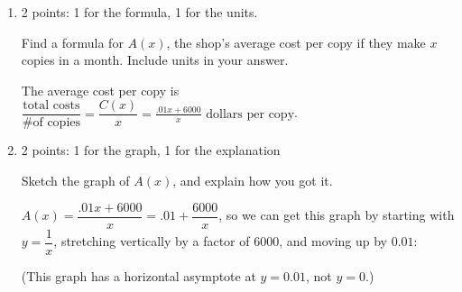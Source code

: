 \documentclass{article}
\begin{document}
\begin{enumerate}
\begin{enumerate}
  \item

    \begin{grading}
      2 points: 1 for the formula, 1 for the units.
    \end{grading}

    \begin{problem}[\stretch{0.35}]
      Find a formula for $A(x)$, the shop's average cost per copy if
      they make $x$ copies in a month. Include units in your answer. 
    \end{problem}

    \begin{solution} 
      The average cost per copy is
      $\dfrac{\text{total costs}}{\text{\# of copies}} = \dfrac{C(x)
      }{x} = \boxed{\frac{.01x +6000}{x} \text{ dollars per copy}}$.
    \end{solution}

  \item

    \begin{grading}
      2 points: 1 for the graph, 1 for the explanation
    \end{grading}

    \begin{problem}[\vfill\newpage]
      Sketch the graph of $A(x)$, and explain how you got it. 
    \end{problem}

    \begin{solution}
      $A(x) = \dfrac{.01x +6000}{x} = .01 + \dfrac{6000}{x}$, so we
      can get this graph by starting with $y = \dfrac{1}{x}$, 
      stretching vertically by a factor of 6000, and moving up by
      $0.01$:
      \begin{center}
      \end{center}
      (This graph has a horizontal asymptote at $y = 0.01$, not $y =
      0$.) 
    \end{solution}

  \end{enumerate}


\end{enumerate}
\end{document}
